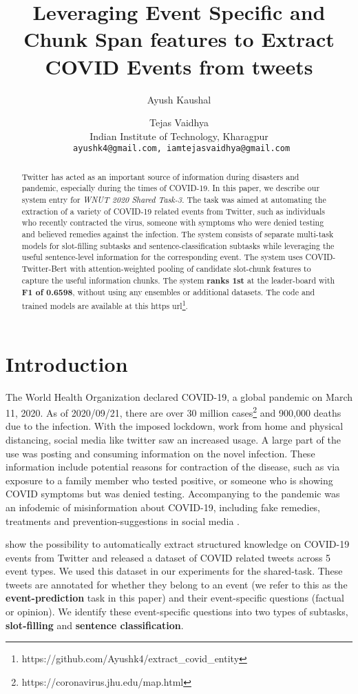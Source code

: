 \documentclass[11pt,a4paper]{article}
\title{Leveraging Event Specific and
Chunk Span features to Extract COVID Events from tweets}
\author{Ayush Kaushal
\and Tejas Vaidhya
\\
  Indian Institute of Technology, Kharagpur \\
  \texttt{ ayushk4@gmail.com, iamtejasvaidhya@gmail.com} \\}
\date{}
\begin{document}
\maketitle
\begin{abstract}

Twitter has acted as an important source of information during disasters and pandemic, especially during the times of COVID-19.
In this paper, we describe our system entry for \textit{WNUT 2020 Shared Task-3}. The task was aimed at automating the extraction of a variety of COVID-19 related events from Twitter, such as individuals who recently contracted the virus, someone with symptoms who were denied testing and believed remedies against the infection.
The system consists of separate multi-task models for slot-filling subtasks and sentence-classification subtasks while leveraging the useful sentence-level information for the corresponding event. The system uses COVID-Twitter-Bert with attention-weighted pooling of candidate slot-chunk features to capture the useful information chunks.
The system \textbf{ranks 1st} at the leader-board with \textbf{F1 of 0.6598}, without using any ensembles or additional datasets.
The code and trained models are available at this https url\footnote{https://github.com/Ayushk4/extract\_covid\_entity}.

\end{abstract}
\section{Introduction}

The World Health Organization declared COVID-19, a global pandemic on March 11, 2020. As of 2020/09/21, there are over 30 million cases\footnote{https://coronavirus.jhu.edu/map.html} and 900,000 deaths due to the infection. With the imposed lockdown, work from home and physical distancing, social media like twitter saw an increased usage. A large part of the use was posting and consuming information on the novel infection. These information include potential reasons for contraction of the disease, such as via exposure to a family member who tested positive, or someone who is showing COVID symptoms but was denied testing. Accompanying to the pandemic was an infodemic of misinformation about COVID-19, including fake remedies, treatments and prevention-suggestions in social media \cite{covid_infodemic}.

\citet{zong2020extracting} show the possibility to automatically extract structured knowledge on COVID-19 events from Twitter and released a dataset of COVID related tweets across 5 event types. We used this dataset in our experiments for the shared-task. These tweets are annotated for whether they belong to an event (we refer to this as the \textbf{event-prediction} task in this paper) and their event-specific questions (factual or opinion). We identify these event-specific questions into two types of subtasks,  \textbf{slot-filling} and \textbf{sentence classification}.
\end{document}
